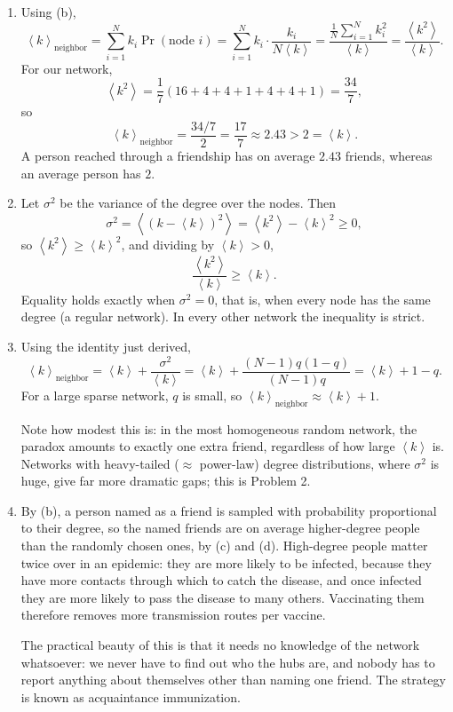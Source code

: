 \documentclass[a4paper,12pt]{article}
\begin{document}
\begin{enumerate}[label=(\alph*)]
\item Using (b),
\[ \left\langle k \right\rangle_{\text{neighbor}} = \sum_{i=1}^{N} k_i \Pr(\text{node } i)
= \sum_{i=1}^{N} k_i \cdot \frac{k_i}{N \left\langle k \right\rangle}
= \frac{\frac{1}{N}\sum_{i=1}^{N} k_i^2}{\left\langle k \right\rangle}
= \frac{\left\langle k^2 \right\rangle}{\left\langle k \right\rangle} . \]
For our network,
\[ \left\langle k^2 \right\rangle = \frac{1}{7}\left( 16+4+4+1+4+4+1 \right) = \frac{34}{7} , \]
so
\[ \left\langle k \right\rangle_{\text{neighbor}} = \frac{34/7}{2} = \frac{17}{7} \approx 2.43 > 2 = \left\langle k \right\rangle . \]
A person reached through a friendship has on average $2.43$ friends, whereas an average person has $2$.

\item Let $\sigma^2$ be the variance of the degree over the nodes. Then
\[ \sigma^2 = \left\langle \left( k-\left\langle k \right\rangle \right)^2 \right\rangle = \left\langle k^2 \right\rangle - \left\langle k \right\rangle^2 \geq 0 , \]
so $\left\langle k^2 \right\rangle \geq \left\langle k \right\rangle^2$, and dividing by $\left\langle k \right\rangle>0$,
\[ \frac{\left\langle k^2 \right\rangle}{\left\langle k \right\rangle} \geq \left\langle k \right\rangle . \]
Equality holds exactly when $\sigma^2=0$, that is, when every node has the same degree (a regular network). In every other network the inequality is strict.

\item Using the identity just derived,
\[ \left\langle k \right\rangle_{\text{neighbor}} = \left\langle k \right\rangle + \frac{\sigma^2}{\left\langle k \right\rangle}
= \left\langle k \right\rangle + \frac{(N-1)q(1-q)}{(N-1)q} = \left\langle k \right\rangle + 1 - q . \]
For a large sparse network, $q$ is small, so $\left\langle k \right\rangle_{\text{neighbor}} \approx \left\langle k \right\rangle+1$.

Note how modest this is: in the most homogeneous random network, the paradox amounts to exactly one extra friend, regardless of how large $\left\langle k \right\rangle$ is. Networks with heavy-tailed ($\approx$ power-law) degree distributions, where $\sigma^2$ is huge, give far more dramatic gaps; this is Problem 2.

\item By (b), a person named as a friend is sampled with probability proportional to their degree, so the named friends are on average higher-degree people than the randomly chosen ones, by (c) and (d). High-degree people matter twice over in an epidemic: they are more likely to be infected, because they have more contacts through which to catch the disease, and once infected they are more likely to pass the disease to many others. Vaccinating them therefore removes more transmission routes per vaccine.

The practical beauty of this is that it needs no knowledge of the network whatsoever: we never have to find out who the hubs are, and nobody has to report anything about themselves other than naming one friend. The strategy is known as acquaintance immunization.
\end{enumerate}
\end{document}
